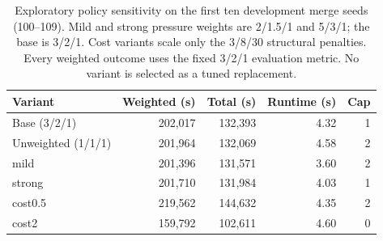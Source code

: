 \begin{table}[!htbp]
\caption{Exploratory policy sensitivity on the first ten development merge seeds (100--109). Mild and strong pressure weights are 2/1.5/1 and 5/3/1; the base is 3/2/1. Cost variants scale only the 3/8/30 structural penalties. Every weighted outcome uses the fixed 3/2/1 evaluation metric. No variant is selected as a tuned replacement.}\label{tab:sensitivity}
\centering\small
\begin{tabularx}{\textwidth}{L R R R r}
\toprule
Variant & Weighted (s) & Total (s) & Runtime (s) & Cap \\
\midrule
Base (3/2/1) & 202,017 & 132,393 & 4.32 & 1 \\
Unweighted (1/1/1) & 201,964 & 132,069 & 4.58 & 2 \\
mild & 201,396 & 131,571 & 3.60 & 2 \\
strong & 201,710 & 131,984 & 4.03 & 1 \\
cost0.5 & 219,562 & 144,632 & 4.35 & 2 \\
cost2 & 159,792 & 102,611 & 4.60 & 0 \\
\bottomrule
\end{tabularx}
\end{table}
